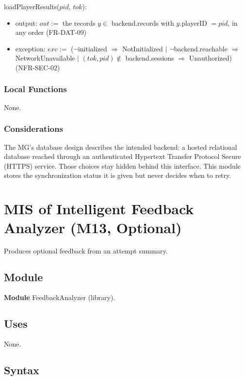\documentclass[12pt, titlepage]{article}
\newcommand{\noinit}{$\neg$initialized $\Rightarrow$ NotInitialized}
\begin{document}
\noindent loadPlayerResults($pid$, $tok$):
\begin{itemize}
\item output: $out :=$ the records $y \in$ backend.records with $y$.playerID
  $= pid$, in any order (FR-DAT-09)
\item exception: $exc :=$ (\noinit{} $|$ $\neg$backend.reachable
  $\Rightarrow$ NetworkUnavailable $|$ $(tok, pid) \notin$ backend.sessions
  $\Rightarrow$ Unauthorized) (NFR-SEC-02)
\end{itemize}

\subsubsection{Local Functions}

None.

\subsubsection{Considerations}

The MG's database design describes the intended backend: a hosted relational
database reached through an authenticated Hypertext Transfer Protocol
Secure (HTTPS) service. Those choices stay
hidden behind this interface. This module stores the synchronization status it
is given but never decides when to retry.

\newpage
\section{MIS of Intelligent Feedback Analyzer (M13, Optional)}
\label{sec:M13}

Produces optional feedback from an attempt summary.

\subsection{Module}

\textbf{Module} FeedbackAnalyzer (library).

\subsection{Uses}

None.

\subsection{Syntax}
\end{document}
